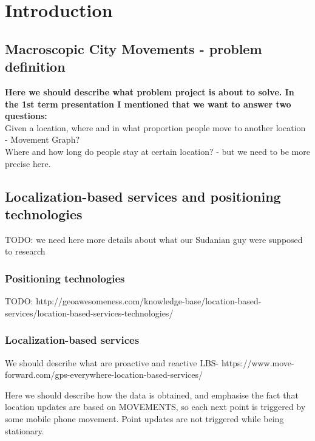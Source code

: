 \chapter{Introduction}
\label{cha:introduction}

\section{Macroscopic City Movements - problem definition}
\label{cha:introduction_probdef}

\textbf{Here we should describe what problem project is about to solve. In the 1st term presentation I mentioned that we want to answer two questions:
}\\
 
Given a location, where and in what proportion people move to another location - Movement Graph? 
\\
Where and how long do people stay at certain location? - but we need to be more precise here.

\section{Localization-based services and positioning technologies}
\label{cha:introduction_methodo}

TODO: we need here more details about what our Sudanian guy were supposed to research
\subsection{Positioning technologies}

TODO: http://geoawesomeness.com/knowledge-base/location-based-services/location-based-services-technologies/

\subsection{Localization-based services}

We should describe what are proactive and reactive LBS- https://www.move-forward.com/gps-everywhere-location-based-services/

Here we should describe how the data is obtained, and emphasise the fact that location updates are based on MOVEMENTS, so each next point is triggered by some mobile phone movement. Point updates are not triggered while being stationary.

